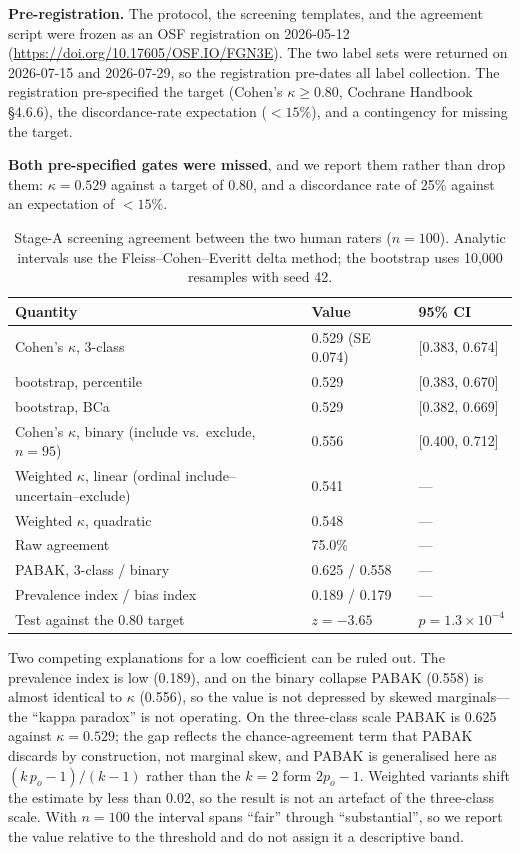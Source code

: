 \documentclass[11pt]{article}
\newenvironment{fittab}{\begin{lrbox}{\fittabbox}}{\end{lrbox}%
  \ifdim\wd\fittabbox>\linewidth\resizebox{\linewidth}{!}{\usebox{\fittabbox}}\else\usebox{\fittabbox}\fi}
\begin{document}
\textbf{Pre-registration.} The protocol, the screening templates, and the agreement script were frozen as an OSF registration on 2026-05-12 (\url{https://doi.org/10.17605/OSF.IO/FGN3E}). The two label sets were returned on 2026-07-15 and 2026-07-29, so the registration pre-dates all label collection. The registration pre-specified the target (Cohen's $\kappa \geq 0.80$, Cochrane Handbook \S4.6.6), the discordance-rate expectation ($<15\%$), and a contingency for missing the target.

\textbf{Both pre-specified gates were missed}, and we report them rather than drop them: $\kappa=0.529$ against a target of $0.80$, and a discordance rate of 25\% against an expectation of $<15\%$.

\begin{table}[htbp]
\centering
\caption{Stage-A screening agreement between the two human raters ($n=100$). Analytic intervals use the Fleiss--Cohen--Everitt delta method; the bootstrap uses 10{,}000 resamples with seed 42.}
\label{tab:humankappa}
\small
\begin{fittab}\begin{tabular}{lll}
\toprule
\textbf{Quantity} & \textbf{Value} & \textbf{95\% CI} \\
\midrule
Cohen's $\kappa$, 3-class & 0.529 (SE 0.074) & [0.383, 0.674] \\
\quad bootstrap, percentile & 0.529 & [0.383, 0.670] \\
\quad bootstrap, BCa & 0.529 & [0.382, 0.669] \\
Cohen's $\kappa$, binary (include vs.\ exclude, $n=95$) & 0.556 & [0.400, 0.712] \\
Weighted $\kappa$, linear (ordinal include--uncertain--exclude) & 0.541 & --- \\
Weighted $\kappa$, quadratic & 0.548 & --- \\
Raw agreement & 75.0\% & --- \\
PABAK, 3-class / binary & 0.625 / 0.558 & --- \\
Prevalence index / bias index & 0.189 / 0.179 & --- \\
Test against the 0.80 target & $z=-3.65$ & $p=1.3\times10^{-4}$ \\
\bottomrule
\end{tabular}\end{fittab}
\end{table}

Two competing explanations for a low coefficient can be ruled out. The prevalence index is low (0.189), and on the binary collapse PABAK (0.558) is almost identical to $\kappa$ (0.556), so the value is not depressed by skewed marginals---the ``kappa paradox'' is not operating. On the three-class scale PABAK is 0.625 against $\kappa{=}0.529$; the gap reflects the chance-agreement term that PABAK discards by construction, not marginal skew, and PABAK is generalised here as $(k\,p_o-1)/(k-1)$ rather than the $k{=}2$ form $2p_o-1$. Weighted variants shift the estimate by less than 0.02, so the result is not an artefact of the three-class scale. With $n=100$ the interval spans ``fair'' through ``substantial'', so we report the value relative to the threshold and do not assign it a descriptive band.
\end{document}
